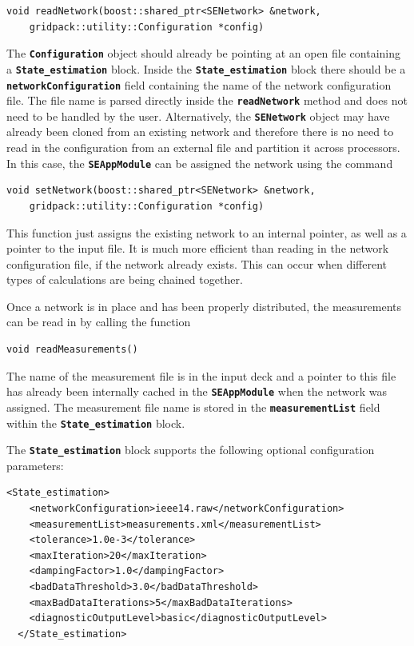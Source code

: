 {
\color{red}
\begin{Verbatim}[fontseries=b]
void readNetwork(boost::shared_ptr<SENetwork> &network,
    gridpack::utility::Configuration *config)
\end{Verbatim}
}

The \texttt{\textbf{Configuration}} object should already be pointing at an open file containing a \texttt{\textbf{State\_estimation}} block. Inside the \texttt{\textbf{State\_estimation}} block there should be a \texttt{\textbf{networkConfiguration}} field containing the name of the network configuration file. The file name is parsed directly inside the \texttt{\textbf{readNetwork}} method and does not need to be handled by the user.
Alternatively, the \texttt{\textbf{SENetwork}} object may have already been cloned from an existing network and therefore there is no need to read in the configuration from an external file and partition it across processors. In this case, the \texttt{\textbf{SEAppModule}} can be assigned the network using the command

{
\color{red}
\begin{Verbatim}[fontseries=b]
void setNetwork(boost::shared_ptr<SENetwork> &network,
    gridpack::utility::Configuration *config)
\end{Verbatim}
}

This function just assigns the existing network to an internal pointer, as well as a pointer to the input file. It is much more efficient than reading in the network configuration file, if the network already exists. This can occur when different types of calculations are being chained together.

Once a network is in place and has been properly distributed, the measurements can be read in by calling the function

{
\color{red}
\begin{Verbatim}[fontseries=b]
void readMeasurements()
\end{Verbatim}
}

The name of the measurement file is in the input deck and a pointer to this file has already been internally cached in the \texttt{\textbf{SEAppModule}} when the network was assigned. The measurement file name is stored in the \texttt{\textbf{measurementList}} field within the \texttt{\textbf{State\_estimation}} block.

The \texttt{\textbf{State\_estimation}} block supports the following optional configuration parameters:

{
\color{blue}
\begin{Verbatim}[fontseries=b]
  <State_estimation>
    <networkConfiguration>ieee14.raw</networkConfiguration>
    <measurementList>measurements.xml</measurementList>
    <tolerance>1.0e-3</tolerance>
    <maxIteration>20</maxIteration>
    <dampingFactor>1.0</dampingFactor>
    <badDataThreshold>3.0</badDataThreshold>
    <maxBadDataIterations>5</maxBadDataIterations>
    <diagnosticOutputLevel>basic</diagnosticOutputLevel>
  </State_estimation>
\end{Verbatim}
}

